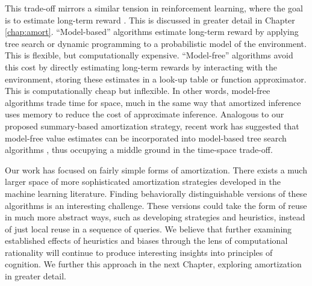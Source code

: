 This trade-off mirrors a similar tension in reinforcement learning, where the goal is to estimate long-term reward \citep{daw2005uncertainty,daw2011model,kool2017cost}. This is discussed in greater detail in Chapter \ref{chap:amort}. ``Model-based'' algorithms estimate long-term reward by applying tree search or dynamic programming to a probabilistic model of the environment. This is flexible, but computationally expensive. ``Model-free'' algorithms avoid this cost by directly estimating long-term rewards by interacting with the environment, storing these estimates in a look-up table or function approximator. This is computationally cheap but inflexible. In other words, model-free algorithms trade time for space, much in the same way that amortized inference uses memory to reduce the cost of approximate inference. Analogous to our proposed summary-based amortization strategy, recent work has suggested that model-free value estimates can be incorporated into model-based tree search algorithms \citep{keramati2016adaptive}, thus occupying a middle ground in the time-space trade-off.

Our work has focused on fairly simple forms of amortization. There exists a much larger space of more sophisticated amortization strategies developed in the machine learning literature\citep{stuhlmuller2013learning,rezende2014stochastic}. Finding behaviorally distinguishable versions of these algorithms is an interesting challenge. These versions could take the form of reuse in much more abstract ways, such as developing strategies and heuristics, instead of just local reuse in a sequence of queries. We believe that further examining established effects of heuristics and biases through the lens of computational rationality will continue to produce interesting insights into principles of cognition. We further this approach in the next Chapter, exploring amortization in greater detail.

